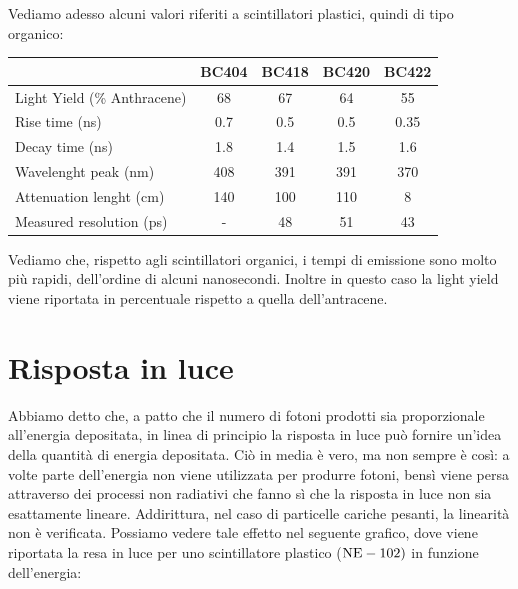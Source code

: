 \begin{esempio}
   Vediamo adesso alcuni valori riferiti a scintillatori plastici, quindi di tipo organico:
   \begin{center}
      \begin{tabular}{|lcccc|}
        \hline
         & BC404 & BC418 & BC420 & BC422\\
        \hline
        Light Yield (\% Anthracene) & 68 & 67 & 64 & 55\\
        \hline
        Rise time (ns) & 0.7 & 0.5 & 0.5 & 0.35\\
        \hline
        Decay time (ns) & 1.8 & 1.4 & 1.5 & 1.6\\
        \hline
        Wavelenght peak (nm) & 408 & 391 & 391 & 370\\
        \hline
        Attenuation lenght (cm) & 140 & 100 & 110 & 8\\
        \hline
        Measured resolution (ps) & - & 48 & 51 & 43\\
        \hline
      \end{tabular}
    \end{center}
   Vediamo che, rispetto agli scintillatori organici, i tempi di emissione sono molto più rapidi, dell'ordine di alcuni nanosecondi. Inoltre in questo caso la light yield viene riportata in percentuale rispetto a quella dell'antracene.
\end{esempio}

\section{Risposta in luce}

Abbiamo detto che, a patto che il numero di fotoni prodotti sia proporzionale all'energia depositata, in linea di principio la risposta in luce può fornire un'idea della quantità di energia depositata. Ciò in media è vero, ma non sempre è così: a volte parte dell'energia non viene utilizzata per produrre fotoni, bensì viene persa attraverso dei processi non radiativi che fanno sì che la risposta in luce non sia esattamente lineare. Addirittura, nel caso di particelle cariche pesanti, la linearità non è verificata. Possiamo vedere tale effetto nel seguente grafico, dove viene riportata la resa in luce per uno scintillatore plastico ($\rm NE-102)$ in funzione dell'energia:

